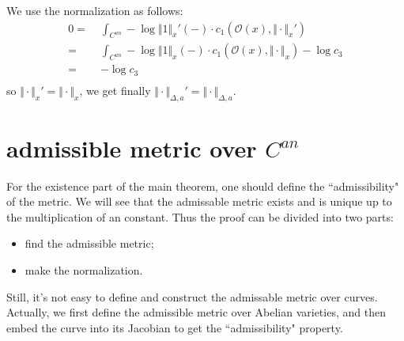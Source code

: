\documentclass[reqno,11pt]{amsart}
\numberwithin{equation}{section}
\theoremstyle{plain}
\theoremstyle{plain}
\numberwithin{equation}{section}
\theoremstyle{remark}
\newcommand{\norm}[1]{\Vert{#1}\Vert}
\begin{document}
We use the normalization as follows:
\begin{equation*}
\begin{aligned}
0  =\;& \int_{C^{an}}-\log \norm{1}_x'(-) \cdot c_1(\mathcal{O}(x),\norm{\cdot}_x')\\ 
  =\;& \int_{C^{an}}-\log \norm{1}_x(-) \cdot c_1(\mathcal{O}(x),\norm{\cdot}_x) -\log c_3 \\ 
  =\;&  -\log c_3 \\ 
\end{aligned}
\end{equation*}
so $\norm{\cdot}_x'=\norm{\cdot}_x$, we get finally $\norm{\cdot}_{\Delta,a}'=\norm{\cdot}_{\Delta,a}$.

\section{admissible metric over $C^{an}$}\label{sec:existence}

For the existence part of the main theorem, one should define the ``admissibility" of the metric. We will see that the admissable metric exists and is unique up to the multiplication of an constant. Thus the proof can be divided into two parts:
\begin{itemize}
\item find the admissible metric;
\item make the normalization.
\end{itemize}
Still, it's not easy to define and construct the admissable metric over curves. Actually, we first define the admissible metric over Abelian varieties, and then embed the curve into its Jacobian to get the ``admissibility" property.
\end{document}
